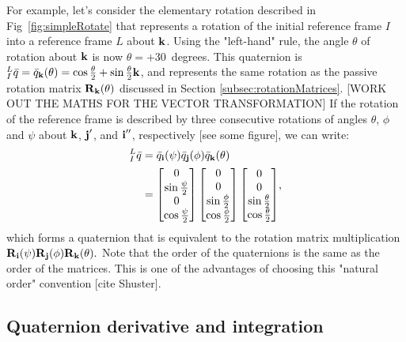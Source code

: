 For example, let's consider the elementary rotation described in Fig~\ref{fig:simpleRotate} that represents a rotation of the initial reference frame $I$ into a reference frame $L$ about $\textrm{\textbf{k}}$. Using the "left-hand" rule, the angle $\theta$ of rotation about $\textrm{\textbf{k}}$ is now $\theta = +30$~degrees. This quaternion is ${}_{I}^{L}\bar{q} = \bar{q}_{\textrm{\textbf{k}}}(\theta) = \cos\frac{\theta}{2} + \sin\frac{\theta}{2}\textrm{\textbf{k}}$, and represents the same rotation as the passive rotation matrix $\textrm{\textbf{R}}_{\textrm{\textbf{k}}}(\theta)$ discussed in Section \ref{subsec:rotationMatrices}. [WORK OUT THE MATHS FOR THE VECTOR TRANSFORMATION] If the rotation of the reference frame is described by three consecutive rotations of angles $\theta$, $\phi$ and $\psi$ about $\textrm{\textbf{k}}$, $\textrm{\textbf{j}}'$, and $\textrm{\textbf{i}}''$, respectively [see some figure], we can write:
\begin{equation}
\begin{split}
{}_{I}^{L}\bar{q} & =  \bar{q}_{\textrm{\textbf{i}}}(\psi)\bar{q}_{\textrm{\textbf{j}}}(\phi)\bar{q}_{\textrm{\textbf{k}}}(\theta) \\
& = \begin{bmatrix}
0\\
\sin\frac{\psi}{2}\\
0\\
\cos\frac{\psi}{2}
\end{bmatrix}\begin{bmatrix}
0\\
0\\
\sin\frac{\phi}{2}\\
\cos\frac{\phi}{2}
\end{bmatrix}\begin{bmatrix}
0\\
0\\
\sin\frac{\theta}{2}\\
\cos\frac{\theta}{2}
\end{bmatrix}\\
\end{split},
\end{equation}
which forms a quaternion that is equivalent to the rotation matrix multiplication $ \textrm{\textbf{R}}_{\textrm{\textbf{i}}}(\psi)\textrm{\textbf{R}}_{\textrm{\textbf{j}}}(\phi)\textrm{\textbf{R}}_{\textrm{\textbf{k}}}(\theta).$
Note that the order of the quaternions is the same as the order of the matrices. This is one of the advantages of choosing this "natural order" convention [cite Shuster].


\subsection{Quaternion derivative and integration}

